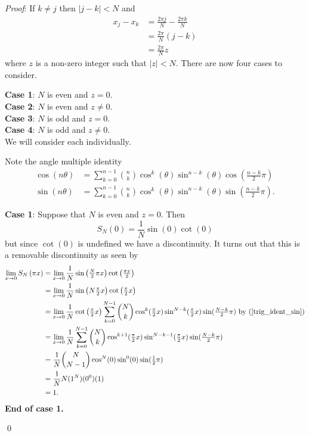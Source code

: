 \documentclass[12pt]{article}
\renewenvironment{proof}{\hspace{-4 ex} \emph{Proof}:}{\qed}
\begin{document}
\begin{proof} If $k \neq j$ then $\vert j - k \vert < N$ and
	\begin{align*}
		x_j - x_k &= \frac{2\pi j}{N} - \frac{2\pi k}{N} \\
		&= \frac{2\pi}{N} (j-k) \\
		&= \frac{2\pi}{N}z
	\end{align*}
	where $z$ is a non-zero integer such that $\vert z \vert < N$. There are now four cases to consider. 
	\bigbreak
	
	\textbf{Case 1}: $N$ is even and $z=0$. \\
	\textbf{Case 2}: $N$ is even and $z \neq 0$. \\
	\textbf{Case 3}: $N$ is odd and $z=0$. \\
	\textbf{Case 4}: $N$ is odd and $z \neq 0$. \\
	We will consider each individually.
	\bigbreak
	
	Note the angle multiple identity
	\begin{align}
	\cos(n \theta) &= \sum_{k=0}^{n-1} {n \choose k} \cos^k(\theta) \sin^{n-k}(\theta) \cos(\tfrac{n-k}{2}\pi) \label{trig_ident_cos} \\
	\sin(n \theta) &= \sum_{k=0}^{n-1} {n \choose k} \cos^k(\theta) \sin^{n-k}(\theta) \sin(\tfrac{n-k}{2}\pi) \text{.} \label{trig_ident_sin}
	\end{align}
	
	\textbf{Case 1}: Suppose that $N$ is even and $z=0$. \bigbreak
	Then
	$$
	S_N(0) = \frac{1}{N} \sin \left(0 \right) \cot \left( 0 \right)
	$$
	but since $\cot(0)$ is undefined we have a discontinuity. It turns out that this is a removable discontinuity as seen by
	\begin{align*}
		\lim_{x \to 0}S_N \left( \pi x \right) &= \lim_{x \to 0} \frac{1}{N} \sin \left(\tfrac{N}{2} \pi x \right) \cot \left( \tfrac{\pi x}{2}  \right) \\
		&= \lim_{x \to 0} \frac{1}{N} \sin \left(N \tfrac{\pi}{2}x \right) \cot \left( \tfrac{\pi}{2}x \right) \\
		&= \lim_{x \to 0} \frac{1}{N}  \cot \left( \tfrac{\pi}{2}x \right) \sum_{k=0}^{N-1} {N \choose k} \cos^k(\tfrac{\pi}{2}x) \sin^{N-k}(\tfrac{\pi}{2}x) \sin(\tfrac{N-k}{2}\pi) \text{ by }(\ref{trig_ident_sin})\\
		&= \lim_{x \to 0} \frac{1}{N} \sum_{k=0}^{N-1} {N \choose k} \cos^{k+1}(\tfrac{\pi}{2}x) \sin^{N-k-1}(\tfrac{\pi}{2}x) \sin(\tfrac{N-k}{2}\pi) \\
		&= \frac{1}{N} {N \choose N-1} \cos^{N}(0)\sin^{0}(0) \sin(\tfrac{1}{2}\pi) \\
		&= \frac{1}{N} N (1^{N})(0^0)(1) \\
		&= 1 \text{.}
	\end{align*}
	\textbf{End of case 1.}
	\bigbreak
	

\end{proof}
\end{document}
